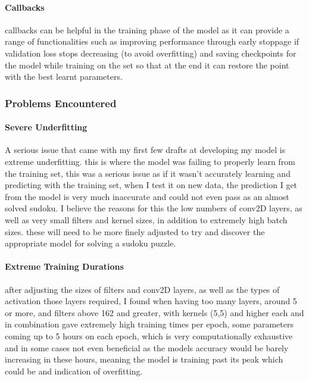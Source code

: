 \documentclass[]{final_report}
\begin{document}
\paragraph{Callbacks}
callbacks can be helpful in the training phase of the model as it can provide a range of functionalities such as improving performance through early stoppage if validation loss stops decreasing (to avoid overfitting) and saving checkpoints for the model while training on the set so that at the end it can restore the point with the best learnt parameters.

\subsubsection{Problems Encountered}

\paragraph{Severe Underfitting}
A serious issue that came with my first few drafts at developing my model is extreme underfitting. this is where the model was failing to properly learn from the training set, this was a serious issue as if it wasn't accurately learning and predicting with the training set, when I test it on new data, the prediction I get from the model is very much inaccurate and could not even pass as an almost solved sudoku. I believe the reasons for this the low numbers of conv2D layers, as well as very small filters and kernel sizes, in addition to extremely high batch sizes. these will need to be more finely adjusted to try and discover the appropriate model for solving a sudoku puzzle.

\paragraph{Extreme Training Durations}
after adjusting the sizes of filters and conv2D layers, as well as the types of activation those layers required, I found when having too many layers, around 5 or more, and filters above 162 and greater, with kernels (5,5) and higher each and in combination gave extremely high training times per epoch, some parameters coming up to 5 hours on each epoch, which is very computationally exhaustive and in some cases not even beneficial as the models accuracy would be barely increasing in these hours, meaning the model is training past its peak which could be and indication of overfitting. 
\end{document}
